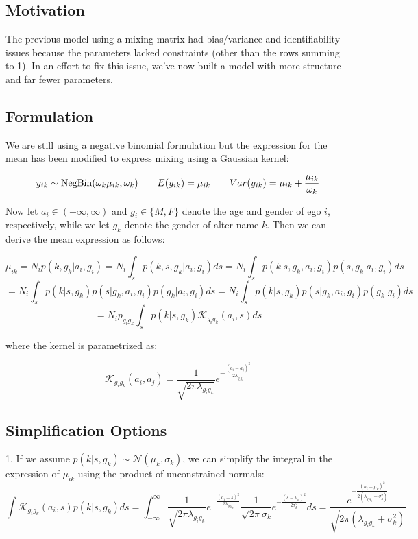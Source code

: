 \documentclass[12pt]{article}
\begin{document}

\def\ci{\perp\!\!\!\perp}
\def\ex{\mathbb{E}}
\def\prob{\mathbb{P}}
\def\ind{\mathbb{I}}
\def\grad{\triangledown}
\def\bigo{\mathcal{O}}

\subsection*{Motivation}
The previous model using a mixing matrix had bias/variance and identifiability issues because the parameters lacked constraints (other than the rows summing to 1). In an effort to fix this issue, we've now built a model with more structure and far fewer parameters.

\subsection*{Formulation}
We are still using a negative binomial formulation but the expression for the mean has been modified to express mixing using a Gaussian kernel:

$$ y_{ik} \sim \text{NegBin}(\omega_k \mu_{ik}, \omega_k)
\hspace{20 pt} E(y_{ik}) = \mu_{ik} 
\hspace{20 pt} Var(y_{ik}) = \mu_{ik} + \frac{\mu_{ik}}{\omega_k}$$

\noindent  Now let $a_i \in (-\infty,\infty)$ and $g_i \in \{M,F\}$ denote the age and gender of ego $i$, respectively, while we let $g_k$ denote the gender of alter name $k$. Then we can derive the mean expression as follows:

$$ \mu_{ik} = N_i p(k, g_k | a_i, g_i)
= N_i \int_s p(k, s, g_k | a_i, g_i) ds
= N_i \int_s p(k | s, g_k, a_i, g_i) p(s, g_k | a_i, g_i) ds $$
$$ = N_i \int_s p(k | s, g_k) p(s | g_k, a_i, g_i) p(g_k | a_i, g_i) ds
= N_i \int_s p(k | s, g_k) p(s | g_k, a_i, g_i) p(g_k | g_i) ds $$
$$ = N_i p_{g_ig_k} \int_s p(k | s, g_k) \mathcal{K}_{g_ig_k}(a_i, s) ds$$

\noindent where the kernel is parametrized as:

$$ \mathcal{K}_{g_ig_k}(a_i, a_j) = \frac{1}{\sqrt{2\pi\lambda_{g_ig_k}}} e^{-\frac{(a_i-a_j)^2}{2\lambda_{g_ig_k}}} $$

\subsection*{Simplification Options}
1. If we assume $p(k | s, g_k) \sim \mathcal{N}(\mu_{k}, \sigma_{k})$, we can simplify the integral in the expression of $\mu_{ik}$ using the product of unconstrained normals:
$$ \int \mathcal{K}_{g_ig_k}(a_i, s) p(k | s, g_k) ds
=  \int_{-\infty}^{\infty} \frac{1}{\sqrt{2\pi\lambda_{g_ig_k}}} e^{-\frac{(a_i-s)^2}{2\lambda_{g_ig_k}}} \frac{1}{\sqrt{2\pi}\sigma_{k}} e^{-\frac{(s-\mu_k)^2}{2\sigma_{k}^2}}ds 
= \frac{ e^{-\frac{(a_i-\mu_k)^2}{2(\lambda_{g_ig_k}+\sigma_{k}^2)}} }{\sqrt{2\pi(\lambda_{g_ig_k} + \sigma_{k}^2)}} $$
\end{document}
